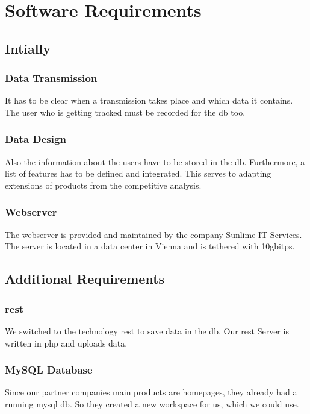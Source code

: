 \chapter{Software Requirements}
\section{Intially}
\subsection{Data Transmission}
It has to be clear when a transmission takes place and which data it contains. The user who is getting tracked must be recorded for the \gls{db} too.
\subsection{Data Design}
Also the information about the users have to be stored in the \gls{db}. Furthermore, a list of features has to be defined and integrated. This serves to adapting extensions of products from the competitive analysis.
\subsection{Webserver}
The webserver is provided and maintained by the company Sunlime IT Services. The server is located in a data center in Vienna and is tethered with 10\gls{gbitps}.
\section{Additional Requirements}
\subsection{\gls{rest}}
We switched to the technology \gls{rest} to save data in the \gls{db}. Our \gls{rest} Server is written in \gls{php} and uploads data.
\subsection{MySQL Database}
Since our partner companies main products are homepages, they already had a running \gls{mysql} \gls{db}. So they created a new workspace for us, which we could use.